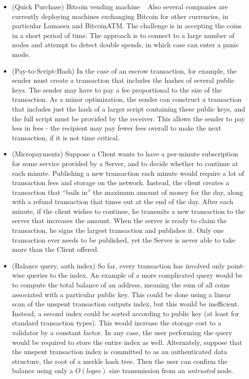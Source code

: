 \begin{itemize}
\item (Quick Purchase) Bitcoin vending machine ~\cite{bitcoinsnack} Also several companies are currently deploying machines exchanging Bitcoin for other currencies, in particular Lamassu and BitcoinATM. The challenge is in accepting the coins in a short period of time. The approach is to connect to a large number of nodes and attempt to detect double spends, in which case can enter a panic mode.

\item (Pay-to-Script-Hash) In the case of an escrow transaction, for example, the sender must create a transaction that includes the hashes of several public keys. The sender may have to pay a fee proportional to the size of the transaction. As a minor optimization, the sender can construct a transaction that includes just the hash of a larger script containing these public keys, and the full script must be provided by the receiver. This allows the sender to pay less in fees - the recipient may pay fewer fees overall to make the next transaction, if it is not time critical.~\cite{paytoscripthash}
\item (Micropayments) Suppose a Client wants to have a per-minute subscription for some service provided by a Server, and to decide whether to continue at each minute. Publishing a new transaction each minute would require a lot of transaction fees and storage on the network. Instead, the client creates a transaction that ``bails in'' the maximum amount of money for the day, along with a refund transaction that times out at the end of the day. After each minute, if the client wishes to continue, he transmits a new transaction to the server that increases the amount. When the server is ready to claim the transaction, he signs the largest transaction and publishes it. Only one transaction ever needs to be published, yet the Server is never able to take more than the Client offered.
\item (Balance query, auth index) So far, every transaction has involved only point-wise queries to the index. An example of a more complicated query would be to compute the total balance of an address, meaning the sum of all coins associated with a particular public key. This could be done using a linear scan of the unspent transaction outputs index, but this would be inefficient. Instead, a second index could be sorted according to public key (at least for standard transaction types). This would increase the storage cost to a validator by a constant factor. In any case, the user performing the query would be required to store the entire index as well. Alternately, suppose that the unspent transaction index is committed to as an authenticated data structure, the root of a merkle hash tree. Then the user can confirm the balance using only a $O(log m)$ size transmission from an {\em untrusted} node.
\end{itemize}

